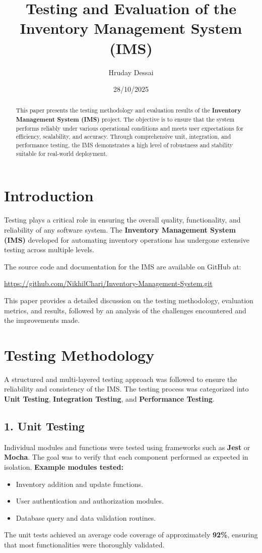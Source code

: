 \documentclass[12pt,a4paper]{article}
\title{\textbf{Testing and Evaluation of the Inventory Management System (IMS)}}
\author{Hruday Dessai}
\date{28/10/2025}
\begin{document}
\maketitle

\begin{abstract}
This paper presents the testing methodology and evaluation results of the \textbf{Inventory Management System (IMS)} project. The objective is to ensure that the system performs reliably under various operational conditions and meets user expectations for efficiency, scalability, and accuracy. Through comprehensive unit, integration, and performance testing, the IMS demonstrates a high level of robustness and stability suitable for real-world deployment.
\end{abstract}

\section{Introduction}
Testing plays a critical role in ensuring the overall quality, functionality, and reliability of any software system. The \textbf{Inventory Management System (IMS)} developed for automating inventory operations has undergone extensive testing across multiple levels.

The source code and documentation for the IMS are available on GitHub at:

\begin{center}
\href{https://github.com/NikhilChari/Inventory-Management-System.git}{https://github.com/NikhilChari/Inventory-Management-System.git}
\end{center}

This paper provides a detailed discussion on the testing methodology, evaluation metrics, and results, followed by an analysis of the challenges encountered and the improvements made.

\section{Testing Methodology}
A structured and multi-layered testing approach was followed to ensure the reliability and consistency of the IMS. The testing process was categorized into \textbf{Unit Testing}, \textbf{Integration Testing}, and \textbf{Performance Testing}.

\subsection*{1. Unit Testing}
Individual modules and functions were tested using frameworks such as \textbf{Jest} or \textbf{Mocha}. The goal was to verify that each component performed as expected in isolation.  
\textbf{Example modules tested:}
\begin{itemize}
    \item Inventory addition and update functions.
    \item User authentication and authorization modules.
    \item Database query and data validation routines.
\end{itemize}
The unit tests achieved an average code coverage of approximately \textbf{92\%}, ensuring that most functionalities were thoroughly validated.
\end{document}
